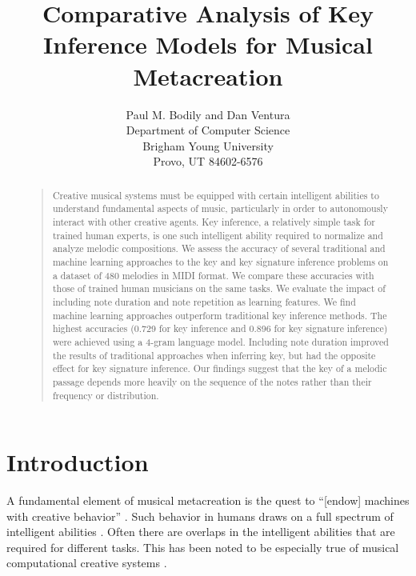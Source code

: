 \documentclass[letterpaper]{article}
\begin{document}
\title{Comparative Analysis of Key Inference Models for Musical Metacreation}
\author{Paul M. Bodily and Dan Ventura\\
Department of Computer Science\\
Brigham Young University\\
Provo, UT 84602-6576\\
}
	\maketitle
	\begin{abstract}
		\begin{quote}
Creative musical systems must be equipped with certain intelligent abilities to understand fundamental aspects of music, particularly in order to autonomously interact with other creative agents. Key inference, a relatively simple task for trained human experts, is one such intelligent ability required to normalize and analyze melodic compositions. We assess the accuracy of several traditional and machine learning approaches to the key and key signature inference problems on a dataset of 480 melodies in MIDI format. We compare these accuracies with those of trained human musicians on the same tasks. We evaluate the impact of including note duration and note repetition as learning features. We find machine learning approaches outperform traditional key inference methods. The highest accuracies (0.729 for key inference and 0.896 for key signature inference) were achieved using a 4-gram language model. Including note duration improved the results of traditional approaches when inferring key, but had the opposite effect for key signature inference. Our findings suggest that the key of a melodic passage depends more heavily on the sequence of the notes rather than their frequency or distribution.
		\end{quote}
	\end{abstract}
	
\section{Introduction}

A fundamental element of musical metacreation is the quest to ``[endow] machines with creative behavior'' \cite{pasquier2012preface}. Such behavior in humans draws on a full spectrum of intelligent abilities \cite{colton2012computational}. Often there are overlaps in the intelligent abilities that are required for different tasks. This has been noted to be especially true of musical computational creative systems \cite{bodily2017hbpl}.
\end{document}
